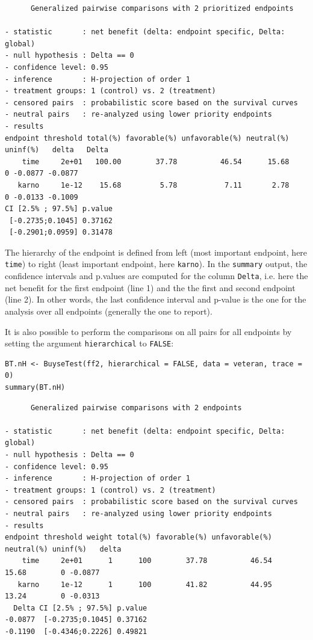 \documentclass[12pt]{article}
\begin{document}
\begin{verbatim}
      Generalized pairwise comparisons with 2 prioritized endpoints

- statistic       : net benefit (delta: endpoint specific, Delta: global) 
- null hypothesis : Delta == 0 
- confidence level: 0.95 
- inference       : H-projection of order 1
- treatment groups: 1 (control) vs. 2 (treatment) 
- censored pairs  : probabilistic score based on the survival curves
- neutral pairs   : re-analyzed using lower priority endpoints
- results
endpoint threshold total(%) favorable(%) unfavorable(%) neutral(%) uninf(%)   delta   Delta
    time     2e+01   100.00        37.78          46.54      15.68        0 -0.0877 -0.0877
   karno     1e-12    15.68         5.78           7.11       2.78        0 -0.0133 -0.1009
CI [2.5% ; 97.5%] p.value 
 [-0.2735;0.1045] 0.37162 
 [-0.2901;0.0959] 0.31478
\end{verbatim}

The hierarchy of the endpoint is defined from left (most important
endpoint, here \texttt{time}) to right (least important endpoint, here
\texttt{karno}). In the \texttt{summary} output, the confidence intervals and
p.values are computed for the column \texttt{Delta}, i.e. here the net
benefit for the first endpoint (line 1) and the the first and second
endpoint (line 2). In other words, the last confidence interval and
p-value is the one for the analysis over all endpoints (generally the
one to report).

\bigskip

It is also possible to perform the comparisons on all pairs for all
endpoints by setting the argument \texttt{hierarchical} to \texttt{FALSE}:
\lstset{language=r,label= ,caption= ,captionpos=b,numbers=none}
\begin{lstlisting}
BT.nH <- BuyseTest(ff2, hierarchical = FALSE, data = veteran, trace = 0)
summary(BT.nH)
\end{lstlisting}

\begin{verbatim}
      Generalized pairwise comparisons with 2 endpoints

- statistic       : net benefit (delta: endpoint specific, Delta: global) 
- null hypothesis : Delta == 0 
- confidence level: 0.95 
- inference       : H-projection of order 1
- treatment groups: 1 (control) vs. 2 (treatment) 
- censored pairs  : probabilistic score based on the survival curves
- neutral pairs   : re-analyzed using lower priority endpoints
- results
endpoint threshold weight total(%) favorable(%) unfavorable(%) neutral(%) uninf(%)   delta
    time     2e+01      1      100        37.78          46.54      15.68        0 -0.0877
   karno     1e-12      1      100        41.82          44.95      13.24        0 -0.0313
  Delta CI [2.5% ; 97.5%] p.value 
-0.0877  [-0.2735;0.1045] 0.37162 
-0.1190  [-0.4346;0.2226] 0.49821
\end{verbatim}
\end{document}
